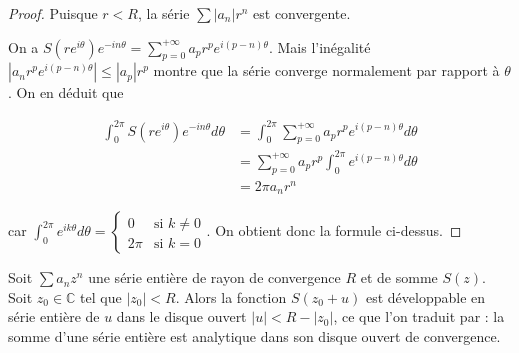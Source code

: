\begin{proof}
Puisque $r < R$, la série $\sum |a_n|r^n$ est convergente.

On a $S(re^{i\theta})e^{-in\theta} = \sum_{p=0}^{+\infty} a_p r^p e^{i(p-n)\theta}$.
Mais l'inégalité $|a_n r^p e^{i(p-n)\theta}| \leq |a_p| r^p$ montre que la série converge normalement par rapport à $\theta$. On en déduit que

\begin{align*}
\int_0^{2\pi} S(re^{i\theta})e^{-in\theta} d\theta &= \int_0^{2\pi} \sum_{p=0}^{+\infty} a_p r^p e^{i(p-n)\theta} d\theta \\
&= \sum_{p=0}^{+\infty} a_p r^p \int_0^{2\pi} e^{i(p-n)\theta} d\theta \\
&= 2\pi a_n r^n
\end{align*}

car $\int_0^{2\pi} e^{ik\theta} d\theta = \begin{cases} 0 & \text{si } k \neq 0 \\ 2\pi & \text{si } k = 0 \end{cases}$. On obtient donc la formule ci-dessus.
\end{proof}

\begin{thm}
Soit $\sum a_n z^n$ une série entière de rayon de convergence $R$ et de somme $S(z)$. Soit $z_0 \in \mathbb{C}$ tel que $|z_0| < R$. Alors la fonction $S(z_0 + u)$ est développable en série entière de $u$ dans le disque ouvert $|u| < R - |z_0|$, ce que l'on traduit par : la somme d'une série entière est analytique dans son disque ouvert de convergence.
\end{thm}

